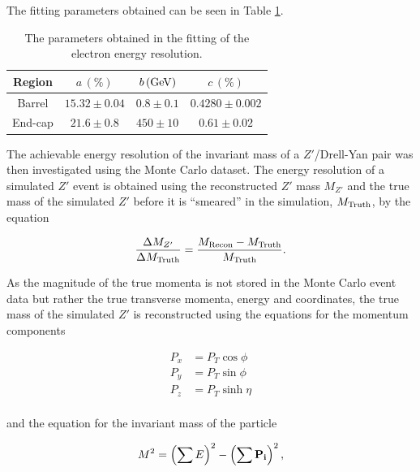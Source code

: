 \documentclass{article}
\begin{document}
The fitting parameters obtained can be seen in Table \ref{table:electronResolution}.

\begin{table}[h!t]
\centering
\caption{The parameters obtained in the fitting of the electron energy resolution. \label{table:electronResolution}}
\begin{tabular}{ |c|c|c|c| } 
\hline
Region & $a\,(\%)$ & $b\,(\rm{GeV})$ & $c\,(\%)$\\\hline
Barrel & $15.32\pm0.04$ & $0.8\pm0.1$ & $0.4280\pm0.002$ \\\hline
End-cap & $21.6\pm0.8$ & $450\pm10$ & $0.61\pm0.02$  \\\hline
\end{tabular}
\end{table}



The achievable energy resolution of the invariant mass of a $Z'$/Drell-Yan pair was then investigated using the Monte Carlo dataset. The energy resolution of a simulated $Z'$ event is obtained using the reconstructed $Z'$ mass $M_{Z'}$ and the true mass of the simulated $Z'$ before it is ``smeared'' in the simulation, $M_{\rm{Truth}}$, by the equation

\begin{equation}
\frac{\Delta M_{Z'}}{\Delta M_{\rm{Truth}}} = \frac{M_{\rm{Recon}}-M_{\rm{Truth}}}{M_{\rm{Truth}}}.
\end{equation}

As the magnitude of the true momenta is not stored in the Monte Carlo event data but rather the true transverse momenta, energy and coordinates, the true mass of  the simulated $Z'$ is reconstructed using the equations for the momentum components

\begin{equation}
\begin{split}
P_x & = P_T \cos\phi \\
P_y & = P_T \sin\phi \\
P_z & = P_T\sinh\eta \\
\end{split}
\end{equation}

and the equation for the invariant mass of the particle

\begin{equation}
M^2 = \left(\sum E\right)^2 - \left(\sum \bf{P}_i\right)^2,
\end{equation}
\end{document}
